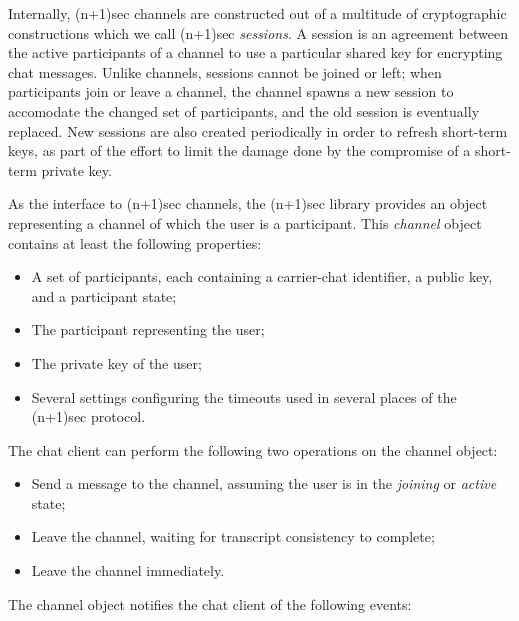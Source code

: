 \documentclass{article}
\begin{document}
Internally, (n+1)sec channels are constructed out of a multitude of cryptographic constructions which we call (n+1)sec \emph{sessions}.
A session is an agreement between the active participants of a channel to use a particular shared key for encrypting chat messages.
Unlike channels, sessions cannot be joined or left; when participants join or leave a channel, the channel spawns a new session to accomodate the changed set of participants, and the old session is eventually replaced.
New sessions are also created periodically in order to refresh short-term keys, as part of the effort to limit the damage done by the compromise of a short-term private key.

As the interface to (n+1)sec channels, the (n+1)sec library provides an object representing a channel of which the user is a participant.
This \emph{channel} object contains at least the following properties:
\begin{itemize}
\item A set of participants, each containing a carrier-chat identifier, a public key, and a participant state;
\item The participant representing the user;
\item The private key of the user;
\item Several settings configuring the timeouts used in several places of the (n+1)sec protocol.
\end{itemize}
The chat client can perform the following two operations on the channel object:
\begin{itemize}
\item Send a message to the channel, assuming the user is in the \emph{joining} or \emph{active} state;
\item Leave the channel, waiting for transcript consistency to complete;
\item Leave the channel immediately.
\end{itemize}
The channel object notifies the chat client of the following events:
\end{document}
